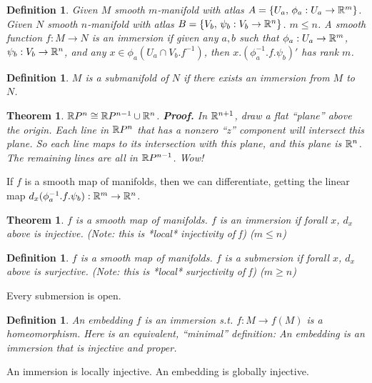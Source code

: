 \documentclass[11pt,leqno,oneside]{amsart}
\theoremstyle{mystyle} \newtheorem{thrm}[thm]{Theorem}
\theoremstyle{mystyle} \newtheorem{defi}[thm]{Definition}
\begin{document}
\begin{defi}
	Given $M$ smooth $m$-manifold with atlas $A = \{ U_a, \,\phi_a : U_a \to {\mathbb R}^m \}$.
	Given $N$ smooth $n$-manifold with atlas $B = \{ V_b, \,\psi_b : V_b \to {\mathbb R}^n \}$.
	$m \leq n$.
	A smooth function $f : M \to N$  is an \emph{immersion} if given any $a, b$ such that $\phi_a: U_a \to {\mathbb R}^m$, $\psi_b: V_b \to {\mathbb R}^n$, and any $x \in \phi_a(U_a \cap V_b.f^{-1})$, then $x.(\phi_a^{-1}.f.\psi_b)'$ has rank $m$.
\end{defi}

\begin{defi}
	$M$ is a \emph{submanifold} of $N$ if there exists an immersion from $M$ to $N$.
\end{defi}

\begin{thrm}
	${\mathbb R} P^n \mathrel{\cong} {\mathbb R} P^{n-1} \cup {\mathbb R}^n$.
	\textbf{Proof.}  In ${\mathbb R}^{n+1}$, draw a flat ``plane'' above the origin.  Each line in ${\mathbb R} P^n$ that has a nonzero ``z'' component will intersect this plane.  So each line maps to its intersection with this plane, and this plane is ${\mathbb R}^n$.  The remaining lines are all in ${\mathbb R} P^{n-1}$.  Wow!
\end{thrm}



If $f$ is a smooth map of manifolds, then we can differentiate, getting the linear map $d_x(\phi_a^{-1}.f.\psi_b): {\mathbb R}^m \to {\mathbb R}^n$.

\begin{thrm}
	$f$ is a smooth map of manifolds.
	$f$ is an \emph{immersion} if forall $x$, $d_x$ above is injective.  (Note: this is *local* injectivity of f) ($m \leq n$)
\end{thrm}

\begin{defi}
	$f$ is a smooth map of manifolds.
	$f$ is a \emph{submersion} if forall $x$, $d_x$ above is surjective.  (Note: this is *local* surjectivity of f) ($m \geq n$)
\end{defi}
\begin{prop}
	Every submersion is open.
\end{prop}

\begin{defi}
	An \emph{embedding} $f$ is an immersion s.t. $f : M \to f(M)$ is a homeomorphism.  Here is an equivalent, ``minimal'' definition:  An \emph{embedding} is an immersion that is injective and proper.
\end{defi}

An immersion is locally injective.  An embedding is globally injective.
\end{document}
